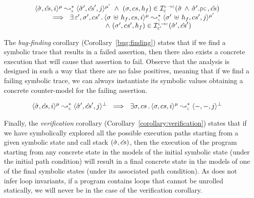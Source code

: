 \begin{theorem}\label{teo:soundness:jsil:symb:exe}
$$
\begin{array}{l}
\transabssemrule{\sstate, \scs, i}{\sstate', \scs', j}{\mode}{\mode'}{\symbolic} 
    \ \wedge \ (\jstate, \cs, \heap_f) \in \interpret{\symbconc}{\senv}(\sstate \, \wedge \, \sstate'.\pcsel, \scs) \\ \quad \quad 
    \ \implies \ \exists \, \senv', \jstate', \cs' \, . \, 
        \transabssemrule{\jstate \dunion \heap_f, \cs, i}{\jstate' \dunion \heap_f, \cs', j}{\mode}{\mode'}{\concrete} \\ \quad \quad \quad \quad \quad \quad \quad \quad \quad \quad 
               \ \wedge \ (\jstate', \cs', \heap_f) \in \interpret{\symbconc}{\senv'}(\sstate', \scs')
\end{array}
$$
\end{theorem}

The \emph{bug-finding} corollary (Corollary~\ref{bug:finding}) states that if 
we find a symbolic trace that results in a failed assertion, 
then there also exists a concrete execution that will cause that assertion to fail.
Observe that the analysis is designed in such a way that there are no false positives, 
meaning that if we find a failing symbolic trace,
we can always instantiate its symbolic values obtaining a concrete counter-model for the 
failing assertion. %


\begin{corollary}\label{bug:finding}
$$
\transabssemrule{\sstate, \scs, i}{\sstate', \scs', j}{\mode}{\bot}{\symbolic}  
      \ \implies \  \exists \jstate, \cs \, . \, \transabssemrule{\jstate, \cs, i}{-, -, j}{\mode}{\bot}{\concrete} 
$$
\end{corollary}

Finally, the \emph{verification} corollary (Corollary~\ref{corollary:verification})
states that if we have symbolically explored all the possible execution paths
starting from a given symbolic state and call stack $(\hat{\sigma}, \hat{cs})$,  
then the execution of the program starting from  any concrete state in the models 
of the initial symbolic state (under the initial path condition) will result in a final concrete state
in the models of one of the final symbolic states (under its associated path condition).  
As \cosette does not infer loop invariants, if a \jsil program contains loops that cannot be 
unrolled statically, we will never be in the case of the verification corollary. 

